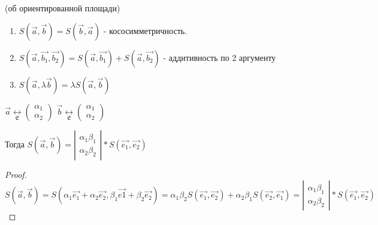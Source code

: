 \begin{theorem}
	(об ориентированной площади)
	
	\begin{enumerate}[]
		
		\item $S(\vec{a},\vec{b}) = S(\vec{b}, \vec{a})$ - кососимметричность.
		
		\item $S(\vec{a}, \vec{b_1} , \vec{b_2}) = S(\vec{a},\vec{b_1}) + S(\vec{a},\vec{b_2})$ - аддитивность по 2 аргументу
			
		\item $S(\vec{a},\lambda \vec{b}) = \lambda S(\vec{a},\vec{b})$ 
	
	\end{enumerate}
\end{theorem}

\begin{proposition}
	$\vec{a} \underset{\mathfrak{E}}{\longleftrightarrow} \begin{pmatrix} 
		\alpha_1 \\
		\alpha_2
	
	\end{pmatrix}$
	$\vec{b} \underset{\mathfrak{E}}{\longleftrightarrow} \begin{pmatrix} 
		\alpha_1 \\
		\alpha_2
	\end{pmatrix}$
	
	Тогда $S(\vec{a}, \vec{b}) =  \left|\begin{matrix} 
	\alpha_1 \beta_1\\
	\alpha_2 \beta_2
	\end{matrix}\right| * S(\vec{e_1},\vec{e_2})$
\end{proposition}

\begin{proof}
	$S(\vec{a}, \vec{b}) = S(\alpha_1\vec{e_1} + \alpha_2\vec{e_2},\beta_1\vec{e1} + \beta_2\vec{e_2}) = \alpha_1\beta_2S(\vec{e_1},\vec{e_2}) + \alpha_2\beta_1S(\vec{e_2}, \vec{e_1}) = \left|\begin{matrix} 
		\alpha_1 \beta_1\\
		\alpha_2 \beta_2
	\end{matrix}\right| * S(\vec{e_1},\vec{e_2})$
\end{proof}


